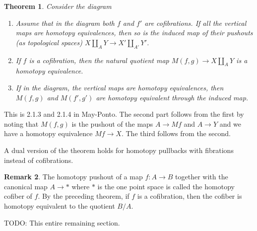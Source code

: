 \documentclass{scrartcl}
\theoremstyle{plain}
\newtheorem{theorem}{Theorem}[section]
\theoremstyle{definition}
\newtheorem{remark}[theorem]{Remark}
\renewcommand{\coprod}{\mathbin{\amalg}}
\begin{document}
\begin{theorem}
    Consider the diagram

    \begin{center}
    \end{center}

    \begin{enumerate}
    \item Assume that in the diagram 
    both $f$ and $f'$ are cofibrations. If all the vertical maps are homotopy equivalences, then so is the induced map of their pushouts (as topological spaces) $X\coprod_A Y \to X'\coprod_{A'} Y'$.
    \item If $f$ is a cofibration, then the natural quotient map $M(f,g)\to X\coprod_A Y$ is a homotopy equivalence.
    \item If in the diagram, the vertical maps are homotopy equivalences, then $M(f, g)$ and $M(f', g')$ are homotopy equivalent through the induced map.
    \end{enumerate}
\end{theorem}
This is 2.1.3 and 2.1.4 in May-Ponto. The second part follows from the first by noting that $M(f, g)$ is the pushout of the maps $A\to Mf$ and $A\to Y$ and we have a homotopy equivalence $Mf \to X$. The third follows from the second.

A dual version of the theorem holds for homotopy pullbacks with fibrations instead of cofibrations.

\begin{remark}
    The homotopy pushout of a map $f\colon A\to B$ together with the canonical map $A\to *$ where $*$ is the one point space is called the homotopy cofiber of $f$. By the preceding theorem, if $f$ is a cofibration, then the cofiber is homotopy equivalent to the quotient $B/A$.
\end{remark}


TODO: This entire remaining section.
\end{document}
